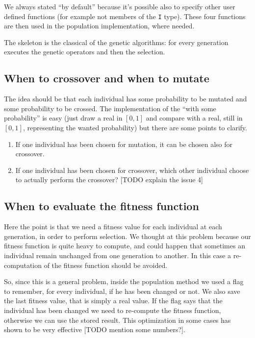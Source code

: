 \documentclass{report}
\begin{document}
We always stated ``by default'' because it's possible also to specify other user defined functions (for example not members of the \texttt{I} type). These four functions are then used in the population implementation, where needed.

The skeleton is the classical of the genetic algorithms: for every generation executes the genetic operators and then the selection.

\subsection{When to crossover and when to mutate}

The idea should be that each individual has some probability to be mutated and some probability to be crossed. The implementation of the ``with some probability'' is easy (just draw a real in $[0,1]$ and compare with a real, still in $[0,1]$, representing the wanted probability) but there are some points to clarify.

\begin{enumerate}
\item If one individual has been chosen for mutation, it can be chosen also for crossover.
\item If one individual has been chosen for crossover, which other individual choose to actually perform the crossover? [TODO explain the issue 4]
\end{enumerate}

\subsection{When to evaluate the fitness function}

Here the point is that we need a fitness value for each individual at each generation, in order to perform selection.
We thought at this problem because our fitness function is quite heavy to compute, and could happen that sometimes an individual remain unchanged from one generation to another. In this case a re-computation of the fitness function should be avoided.

So, since this is a general problem, inside the population method we used a flag to remember, for every individual, if he has been changed or not. We also save the last fitness value, that is simply a real value. If the flag says that the individual has been changed we need to re-compute the fitness function, otherwise we can use the stored result.
This optimization in some cases has shown to be very effective [TODO mention some numbers?].
\end{document}
